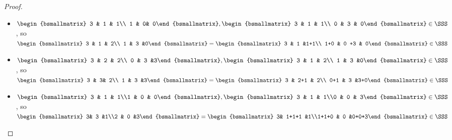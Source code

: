 \documentclass[11pt]{article}
\theoremstyle{definition}
\theoremstyle{remark}
\begin{document}
\begin{proof}
\begin{itemize}
$\begin{bsmallmatrix} 3 & 2 & 2\\ 0 & 3 &3\end{bsmallmatrix}=\begin{bsmallmatrix} 2+1 & 2 & 2\\ 0 & 3+0 & 1 +2\end{bsmallmatrix}\in \SSS$
\item $\begin{bsmallmatrix} 3 & 1 & 1\\ 1 & 0& 0\end{bsmallmatrix},\begin{bsmallmatrix} 3 & 1 & 1\\ 0 & 3 & 0\end{bsmallmatrix}\in \SSS$, 
so $\begin{bsmallmatrix} 3 & 1 & 2\\ 1 & 3 &0\end{bsmallmatrix}=\begin{bsmallmatrix} 3 & 1 &1+1\\ 1+0 & 0 +3 & 0\end{bsmallmatrix}\in \SSS$
\item $\begin{bsmallmatrix} 3 & 2 & 2\\ 0 & 3 &3\end{bsmallmatrix},\begin{bsmallmatrix} 3 & 1 & 2\\ 1 & 3 &0\end{bsmallmatrix}\in \SSS$, so 
$\begin{bsmallmatrix} 3 & 3& 2\\ 1 & 3 &3\end{bsmallmatrix}=\begin{bsmallmatrix} 3 & 2+1 & 2\\ 0+1 & 3 &3+0\end{bsmallmatrix}\in \SSS$
\item $\begin{bsmallmatrix} 3 & 1 & 1\\1 & 0 & 0\end{bsmallmatrix}, \begin{bsmallmatrix} 3 & 1 & 1\\0 & 0 & 3\end{bsmallmatrix}\in \SSS$, so
 $\begin{bsmallmatrix} 3& 3 &1\\2 & 0 &3\end{bsmallmatrix}=\begin{bsmallmatrix} 3& 1+1+1 &1\\1+1+0 & 0 &0+0+3\end{bsmallmatrix}\in \SSS$

\end{itemize}
\end{proof}
\end{document}
